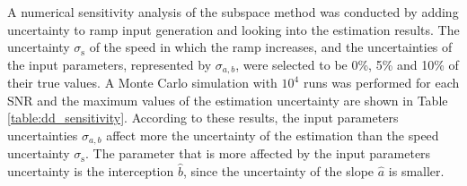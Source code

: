 A numerical sensitivity analysis of the subspace method was conducted by adding uncertainty to ramp input generation and looking into the estimation results. 
The uncertainty $\sigma_{\mathrm{s}}$ of the speed in which the ramp increases, and the uncertainties of the input parameters, represented by $\sigma_{a,b}$, were selected to be 0\%, 5\% and 10\% of their true values.
A Monte Carlo simulation with $10^4$ runs was performed for each SNR and the maximum values of the estimation uncertainty are shown in Table \ref{table:dd_sensitivity}. 
According to these results, the input parameters uncertainties $\sigma_{a,b}$ affect more the uncertainty of the estimation than the speed uncertainty $\sigma_{\mathrm{s}}$. 
The parameter that is more affected by the input parameters uncertainty is the interception $\widehat{b}$, since the uncertainty of the slope $\widehat{a}$ is smaller.



